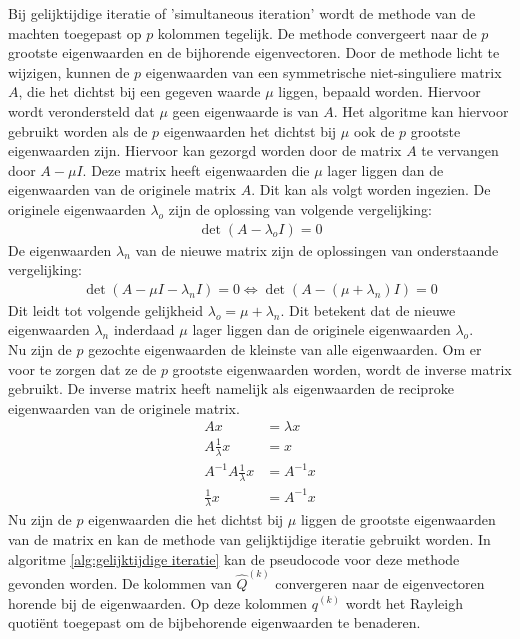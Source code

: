 \documentclass[a4paper, 12pt, titlepage, fleqn]{article}
\begin{document}
Bij gelijktijdige iteratie of 'simultaneous iteration' wordt de methode van de machten toegepast op $p$ kolommen tegelijk. De methode convergeert naar de $p$ grootste eigenwaarden en de bijhorende eigenvectoren. Door de methode licht te wijzigen, kunnen de $p$ eigenwaarden van een symmetrische niet-singuliere matrix $A$, die het dichtst bij een gegeven waarde $\mu$ liggen, bepaald worden. Hiervoor wordt verondersteld dat $\mu$ geen eigenwaarde is van $A$. Het algoritme kan hiervoor gebruikt worden als de $p$ eigenwaarden het dichtst bij $\mu$ ook de $p$ grootste eigenwaarden zijn. Hiervoor kan gezorgd worden door de matrix $A$ te vervangen door $A - \mu I$. Deze matrix heeft eigenwaarden die $\mu$ lager liggen dan de eigenwaarden van de originele matrix $A$. Dit kan als volgt worden ingezien. De originele eigenwaarden $\lambda_o$ zijn de oplossing van volgende vergelijking:
\begin{align*}
\det (A-\lambda_o I) = 0
\end{align*}
De eigenwaarden $\lambda_n$ van de nieuwe matrix zijn de oplossingen van onderstaande vergelijking:
\begin{align*}
\det (A - \mu I - \lambda_n I) = 0 \Leftrightarrow \det(A -(\mu + \lambda_n)I) = 0
\end{align*}
Dit leidt tot volgende gelijkheid $\lambda_o = \mu + \lambda_n$. Dit betekent dat de nieuwe eigenwaarden $\lambda_n$ inderdaad $\mu$ lager liggen dan de originele eigenwaarden $\lambda_o$.\\
Nu zijn de $p$ gezochte eigenwaarden de kleinste van alle eigenwaarden. Om er voor te zorgen dat ze de $p$ grootste eigenwaarden worden, wordt de inverse matrix gebruikt. De inverse matrix heeft namelijk als eigenwaarden de reciproke eigenwaarden van de originele matrix.
\begin{align*}
Ax &= \lambda x\\
A\frac{1}{\lambda}x &= x\\
A^{-1}A\frac{1}{\lambda}x &= A^{-1}x\\
\frac{1}{\lambda}x &= A^{-1}x
\end{align*}
Nu zijn de $p$ eigenwaarden die het dichtst bij $\mu$ liggen de grootste eigenwaarden van de matrix en kan de methode van gelijktijdige iteratie gebruikt worden. In algoritme \ref{alg:gelijktijdige iteratie} kan de pseudocode voor deze methode gevonden worden. De kolommen van $\hat{Q}^{(k)}$ convergeren naar de eigenvectoren horende bij de eigenwaarden. Op deze kolommen $q^{(k)}$ wordt het Rayleigh quoti\"ent toegepast om de bijbehorende eigenwaarden te benaderen.
\end{document}
